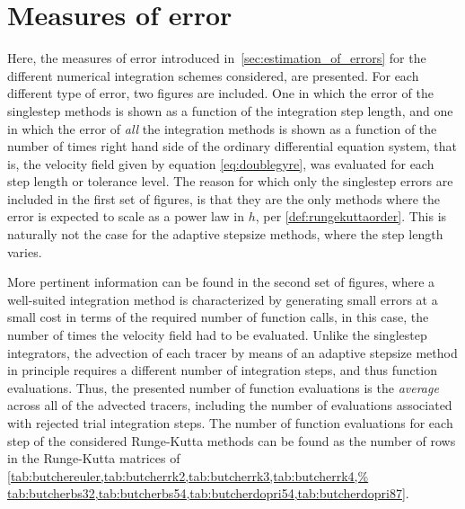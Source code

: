 \section{Measures of error}
\label{sec:measures_of_error}

Here, the measures of error introduced in~\cref{sec:estimation_of_errors} for
the different numerical integration schemes considered, are presented. For
each different type of error, two figures are included. One in which the error
of the singlestep methods is shown as a function of the integration step length,
and one in which the error of \emph{all} the integration methods is shown
as a function of the number of times right hand side of the ordinary
differential equation system, that is, the velocity field given by equation
\eqref{eq:doublegyre}, was evaluated for each step length or tolerance level.
The reason for which only the singlestep errors are included in the first set of
figures, is that they are the only methods where the error is expected to scale
as a power law in $h$, per \cref{def:rungekuttaorder}. This is naturally not the
case for the adaptive stepsize methods, where the step length varies.

More pertinent information can be found in the second set of figures, where
a well-suited integration method is characterized by generating small
errors at a small cost in terms of the required number of function calls,
in this case, the number of times the velocity field had to be evaluated.
Unlike the singlestep integrators, the advection of each tracer by means
of an adaptive stepsize method in principle requires a different number of
integration steps, and thus function evaluations. Thus, the presented number of
function evaluations is the \emph{average} across all of the advected tracers,
including the number of evaluations associated with rejected trial integration
steps. The number of function evaluations for each step of the considered
Runge-Kutta methods can be found as the number of rows in the Runge-Kutta
matrices of
\cref{tab:butchereuler,tab:butcherrk2,tab:butcherrk3,tab:butcherrk4,%
tab:butcherbs32,tab:butcherbs54,tab:butcherdopri54,tab:butcherdopri87}.



